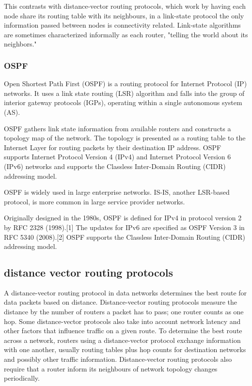\documentclass[a4paper,12pt]{book}
\begin{document}
This contrasts with distance-vector routing protocols, which work by having each node share its routing table with its neighbours, in a link-state protocol the only information passed between nodes is connectivity related. Link-state algorithms are sometimes characterized informally as each router, "telling the world about its neighbors."

\subsubsection{OSPF}
Open Shortest Path First (OSPF) is a routing protocol for Internet Protocol (IP) networks. It uses a link state routing (LSR) algorithm and falls into the group of interior gateway protocols (IGPs), operating within a single autonomous system (AS).

OSPF gathers link state information from available routers and constructs a topology map of the network. The topology is presented as a routing table to the Internet Layer for routing packets by their destination IP address. OSPF supports Internet Protocol Version 4 (IPv4) and Internet Protocol Version 6 (IPv6) networks and supports the Classless Inter-Domain Routing (CIDR) addressing model.

OSPF is widely used in large enterprise networks. IS-IS, another LSR-based protocol, is more common in large service provider networks.

Originally designed in the 1980s, OSPF is defined for IPv4 in protocol version 2 by RFC 2328 (1998).[1] The updates for IPv6 are specified as OSPF Version 3 in RFC 5340 (2008).[2] OSPF supports the Classless Inter-Domain Routing (CIDR) addressing model.

\subsection{distance vector routing protocols}
A distance-vector routing protocol in data networks determines the best route for data packets based on distance. Distance-vector routing protocols measure the distance by the number of routers a packet has to pass; one router counts as one hop. Some distance-vector protocols also take into account network latency and other factors that influence traffic on a given route. To determine the best route across a network, routers using a distance-vector protocol exchange information with one another, usually routing tables plus hop counts for destination networks and possibly other traffic information. Distance-vector routing protocols also require that a router inform its neighbours of network topology changes periodically.
\end{document}
